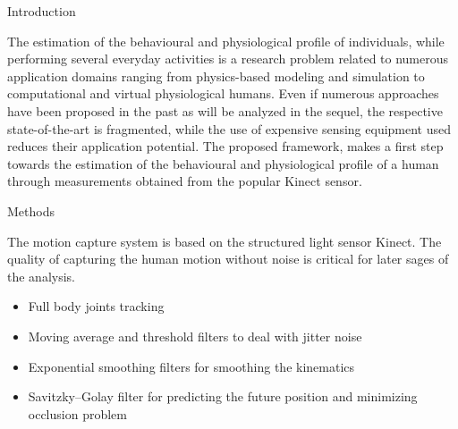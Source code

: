 \documentclass[final]{beamer}
\newlength{\onecolwid}
\begin{document}
\begin{frame}[t]
\begin{columns}[t]
\begin{column}{\onecolwid}
\begin{block}{Introduction}

The estimation of the behavioural and physiological profile of individuals, while performing several everyday activities is a research problem related to numerous application domains ranging from physics-based modeling and simulation to computational and virtual physiological humans. Even if numerous approaches have been proposed in the past as will be analyzed in the sequel, the respective state-of-the-art is fragmented, while the use of expensive sensing equipment used reduces their application potential. The proposed framework, makes a first step towards the estimation of the behavioural and physiological profile of a human through measurements obtained from the popular Kinect sensor.

\end{block}


\begin{block}{Methods}
	
	The motion capture system is based on the structured light sensor Kinect. The quality of capturing the human motion without noise is critical for later sages of the analysis.
	
	\begin{itemize}
		\item Full body joints tracking
		\item Moving average and threshold filters to deal with jitter noise
		\item Exponential smoothing filters for smoothing the kinematics
		\item Savitzky--Golay filter for predicting the future position and minimizing occlusion problem
	\end{itemize}

\end{block}

\end{column} %




\end{columns}
\end{frame}
\end{document}
